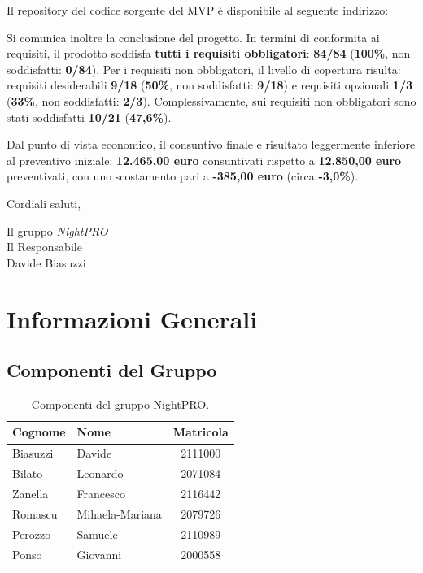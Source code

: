 \documentclass[a4paper, 11pt, oneside]{scrartcl} %
\begin{document}
Il repository del codice sorgente del MVP è disponibile al seguente indirizzo:

\begin{center}
\end{center}
\newpage
Si comunica inoltre la conclusione del progetto. In termini di conformita ai requisiti, il prodotto soddisfa \textbf{tutti i requisiti obbligatori}: \textbf{84/84} (\textbf{100\%}, non soddisfatti: \textbf{0/84}). Per i requisiti non obbligatori, il livello di copertura risulta: requisiti desiderabili \textbf{9/18} (\textbf{50\%}, non soddisfatti: \textbf{9/18}) e requisiti opzionali \textbf{1/3} (\textbf{33\%}, non soddisfatti: \textbf{2/3}). Complessivamente, sui requisiti non obbligatori sono stati soddisfatti \textbf{10/21} (\textbf{47,6\%}).

Dal punto di vista economico, il consuntivo finale e risultato leggermente inferiore al preventivo iniziale: \textbf{12.465,00 euro} consuntivati rispetto a \textbf{12.850,00 euro} preventivati, con uno scostamento pari a \textbf{-385,00 euro} (circa \textbf{-3,0\%}).

\vspace{0.5cm}

Cordiali saluti,
\begin{flushright}
    Il gruppo \emph{NightPRO}\\[1cm]
    Il Responsabile\\[0.3cm]
    Davide Biasuzzi
\end{flushright}

\newpage
\section*{Informazioni Generali}

\subsection*{Componenti del Gruppo}

\begin{table}[h!]
\centering
\renewcommand{\arraystretch}{1.2} %
\begin{tabular}{@{}llc@{}}
\toprule
\textbf{Cognome} & \textbf{Nome} & \textbf{Matricola} \\
\midrule
Biasuzzi & Davide & 2111000 \\
Bilato & Leonardo & 2071084 \\
Zanella & Francesco & 2116442 \\
Romascu & Mihaela-Mariana & 2079726 \\
Perozzo & Samuele & 2110989 \\
Ponso & Giovanni & 2000558 \\
\bottomrule
\end{tabular}
\caption{Componenti del gruppo NightPRO.}
\end{table}
\end{document}
